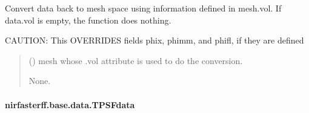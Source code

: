 \documentclass[letterpaper,10pt,english]{sphinxmanual}
\begin{document}
\begin{fulllineitems}
\begin{fulllineitems}
\label{\detokenize{_autosummary/nirfasterff.base.data.FLdata:nirfasterff.base.data.FLdata.tomesh}}
\pysigstartsignatures
\pysiglinewithargsret
{}
{}
{}
\pysigstopsignatures
\sphinxAtStartPar
Convert data back to mesh space using information defined in mesh.vol. If data.vol is empty, the function does nothing.

\sphinxAtStartPar
CAUTION: This OVERRIDES fields phix, phimm, and phifl, if they are defined
\begin{quote}\begin{description}
\sphinxAtStartPar
{} () \textendash{} mesh whose .vol attribute is used to do the conversion.

\sphinxAtStartPar
None.

\end{description}\end{quote}

\end{fulllineitems}


\end{fulllineitems}


\sphinxstepscope


\paragraph{nirfasterff.base.data.TPSFdata}
\label{\detokenize{_autosummary/nirfasterff.base.data.TPSFdata:nirfasterff-base-data-tpsfdata}}\label{\detokenize{_autosummary/nirfasterff.base.data.TPSFdata::doc}}
\end{document}
